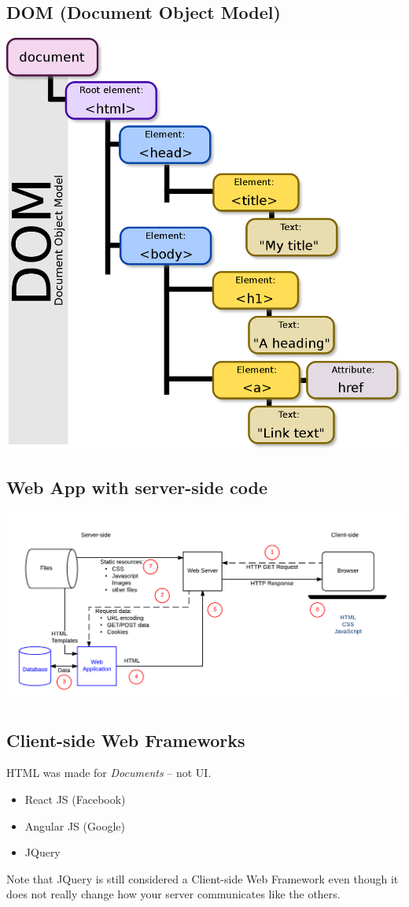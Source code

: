 \subsection{DOM (Document Object Model)}
\includegraphics[scale=0.15]{lectures/wk10/dom.png}

\subsection{Web App with server-side code}
\includegraphics[scale=0.75]{lectures/wk10/web_app.png}


\subsection{Client-side Web Frameworks}
HTML was made for \textit{Documents} -- not UI.
\begin{itemize}
    \item React JS (Facebook)
    \item Angular JS (Google)
    \item JQuery
\end{itemize}
Note that JQuery is still considered a Client-side Web Framework even though it does not really change how your server communicates like the others.

